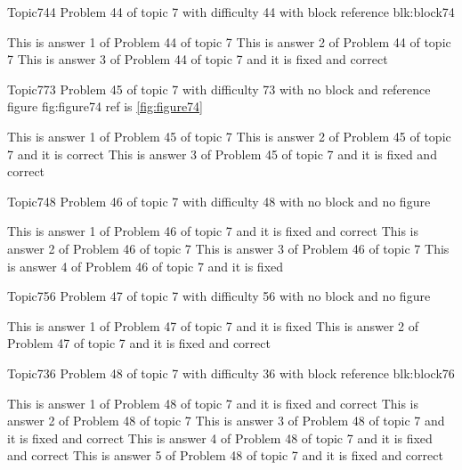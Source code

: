 \documentclass[master]{exam}
\begin{document}
\begin{problem}[requires=blk:block74]{Topic7}{44}
	Problem 44 of topic 7 with difficulty 44 with block reference blk:block74
	\begin{answers}
		\answer This is answer 1 of Problem 44 of topic 7 
		\answer This is answer 2 of Problem 44 of topic 7 
		 This is answer 3 of Problem 44 of topic 7 and it is fixed and correct
	\end{answers}
\end{problem}

\begin{problem}{Topic7}{73}
	Problem 45 of topic 7 with difficulty 73 with no block and reference figure fig:figure74 ref is \ref{fig:figure74}
	\begin{answers}
		\answer This is answer 1 of Problem 45 of topic 7 
		\answer[correct] This is answer 2 of Problem 45 of topic 7 and it is correct
		 This is answer 3 of Problem 45 of topic 7 and it is fixed and correct
	\end{answers}
\end{problem}

\begin{problem}{Topic7}{48}
	Problem 46 of topic 7 with difficulty 48 with no block and no figure
	\begin{answers}
		 This is answer 1 of Problem 46 of topic 7 and it is fixed and correct
		\answer This is answer 2 of Problem 46 of topic 7 
		\answer This is answer 3 of Problem 46 of topic 7 
		\answer[fixed] This is answer 4 of Problem 46 of topic 7 and it is fixed
	\end{answers}
\end{problem}

\begin{problem}{Topic7}{56}
	Problem 47 of topic 7 with difficulty 56 with no block and no figure
	\begin{answers}
		\answer[fixed] This is answer 1 of Problem 47 of topic 7 and it is fixed
		 This is answer 2 of Problem 47 of topic 7 and it is fixed and correct
	\end{answers}
\end{problem}

\begin{problem}[requires=blk:block76]{Topic7}{36}
	Problem 48 of topic 7 with difficulty 36 with block reference blk:block76
	\begin{answers}
		 This is answer 1 of Problem 48 of topic 7 and it is fixed and correct
		\answer This is answer 2 of Problem 48 of topic 7 
		 This is answer 3 of Problem 48 of topic 7 and it is fixed and correct
		 This is answer 4 of Problem 48 of topic 7 and it is fixed and correct
		 This is answer 5 of Problem 48 of topic 7 and it is fixed and correct
	\end{answers}
\end{problem}
\end{document}
